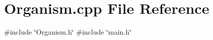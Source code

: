 \section{Organism.\+cpp File Reference}
\label{Organism_8cpp}
{\ttfamily \#include \char`\"{}Organism.\+h\char`\"{}}\newline
{\ttfamily \#include \char`\"{}main.\+h\char`\"{}}\newline

